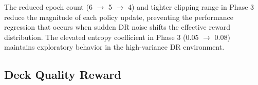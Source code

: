 \begin{table}[htbp]
    \centering
    \caption{MaskablePPO hyperparameters for all four agents across the three training phases.}
    \label{tab:ppo_params}
\end{table}

The reduced epoch count (6 $\to$ 5 $\to$ 4) and tighter clipping range in Phase 3 reduce the magnitude of each policy update, preventing the performance regression that occurs when sudden DR noise shifts the effective reward distribution. The elevated entropy coefficient in Phase 3 (0.05 $\to$ 0.08) maintains exploratory behavior in the high-variance DR environment.

\subsection{Deck Quality Reward}

